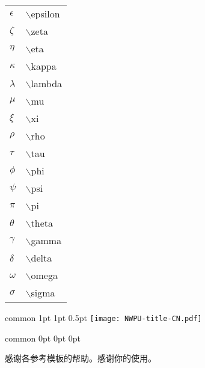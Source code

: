 \documentclass[report, twoside, UTF8, AutoFakeBold = 1, AutoFakeSlant, zihao = -4]{config}
\begin{document}
\begin{center}
\begin{tabular}{ll}
    $\epsilon$ &  $\backslash$epsilon \\
    $\zeta$ &  $\backslash$zeta \\
    $\eta$ &  $\backslash$eta \\
    $\kappa$ &  $\backslash$kappa \\
    $\lambda$ &  $\backslash$lambda \\
    $\mu$ &  $\backslash$mu \\
    $\xi$ &  $\backslash$xi \\
    $\rho$ &  $\backslash$rho \\
    $\tau$ &  $\backslash$tau \\
    $\phi$ &  $\backslash$phi \\
    $\psi$ &  $\backslash$psi \\
    $\pi$ &  $\backslash$pi \\
    $\theta$ &  $\backslash$theta \\
    $\gamma$ &  $\backslash$gamma\\
    $\delta$ &  $\backslash$delta \\
    $\omega$ &  $\backslash$omega \\
    $\sigma$ &  $\backslash$sigma \\
    \end{tabular}
\end{center}


\Header
    {common} %
    {1pt} %
    {1pt} %
    {0.5pt} %
    {} %
    {\texttt{[image: NWPU-title-CN.pdf]}} %
    {} %


\Footer
    {common} %
    {0pt} %
    {0pt} %
    {0pt} %
    {} %
    {\thepage} %
    {} %




\StartAcknowledgements %

感谢各参考模板的帮助。感谢你的使用。
\end{document}
